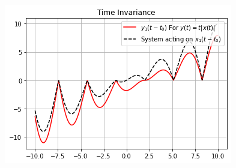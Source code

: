 \documentclass[journal,12pt,twocolumn]{IEEEtran}
\begin{document}
\begin{figure}[h]
\includegraphics[width = \columnwidth]{y2_t}
\end{figure}
\end{document}

